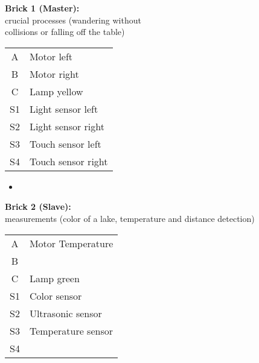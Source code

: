 \documentclass[10pt,a4paper]{article}
\begin{document}
\begin{minipage}[t]{0.4\textwidth}

\textbf{Brick 1 (Master):} \\
crucial processes (wandering without \\collisions or falling off the table)

	\begin{tabular}{|c|l|}
	\hline
	A & Motor left\\
	B & Motor right\\
	C & Lamp yellow\\
	S1 & Light sensor left\\
	S2 & Light sensor right\\
	S3 & Touch sensor left\\
	S4 & Touch sensor right\\
	\hline
	\end{tabular}
	
\end{minipage}
\begin{minipage}[t]{0.2\textwidth}
	\begin{itemize}
	\item[ ]
	\end{itemize}
\end{minipage}
\begin{minipage}[t]{0.4\textwidth}

\textbf{Brick 2 (Slave):} \\
measurements (color of a lake, temperature and distance detection)

	\begin{tabular}{|c|l|}
	\hline
	A & Motor Temperature\\
	B & \\
	C & Lamp green\\
	S1 & Color sensor\\
	S2 & Ultrasonic sensor\\
	S3 & Temperature sensor\\
	S4 & \\
	\hline
	\end{tabular}
\end{minipage}
\end{document}

